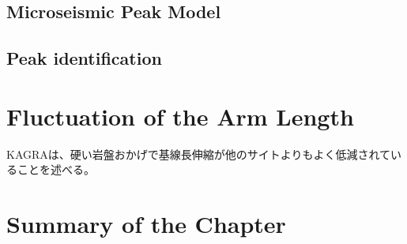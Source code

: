\subsection{Microseismic Peak Model}
\subsection{Peak identification}





\section{Fluctuation of the Arm Length} %
KAGRAは、硬い岩盤おかげで基線長伸縮が他のサイトよりもよく低減されていることを述べる。
\subsection{}



\section{Summary of the Chapter} %
